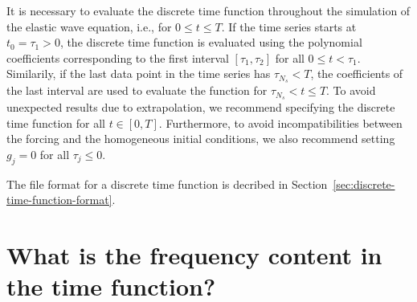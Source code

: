 \documentclass[11pt]{report}
\begin{document}
{It is necessary to evaluate the discrete time function throughout the simulation of the elastic wave
equation, i.e., for $0\leq t\leq T$. If the time series starts at $t_0=\tau_1>0$, the discrete time
function is evaluated using the polynomial coefficients corresponding to the first interval
$[\tau_1,\tau_2]$ for all $0\leq t<\tau_1$. Similarily, if the last data point in the time series
has $\tau_{N_s}<T$, the coefficients of the last interval are used to evaluate the function for
$\tau_{N_s}<t\leq T$. To avoid unexpected results due to extrapolation, we recommend specifying the
discrete time function for all $t\in[0,T]$. Furthermore, to avoid incompatibilities between the
forcing and the homogeneous initial conditions, we also recommend setting $g_j=0$ for all
$\tau_j\leq 0$.

The file format for a discrete time function is decribed in
Section~\ref{sec:discrete-time-function-format}.


\section{What is the frequency content in the time function?}\label{sec:freq}

}
\end{document}
